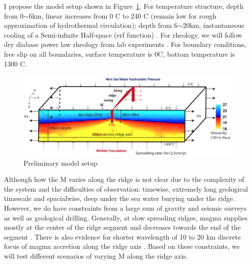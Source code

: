 \documentclass[12pt]{article}
\begin{document}
I propose the model setup shown in Figure~\ref{fig8_1}. For temperature structure, depth from 0$\sim$6km, linear increases from 0 \degree C to 240 \degree C (remain low for rough approximation of hydrothermal circulation); depth from 6$\sim$20km, instantaneous cooling of a Semi-infinite Half-space (erf function) \citep{Turcotte2002}. For rheology, we will follow dry diabase power law rheology from lab experiments \citep{Kirby1987}. For boundary conditions, free slip on all boundaries, surface temperature is 0\degree C, bottom temperature is 1300 \degree C.

\begin{figure}[H]
 \centering
  \includegraphics[scale=0.5]{fig8_1.png}
 \caption{\small Preliminary model setup}
 \label{fig8_1}
\end{figure}


Although how the M varies along the ridge is not clear due to the complexity of the system and the difficulties of observation: timewise, extremely long geological timescale and spacialwise, deep under the sea water burying under the ridge. However, we do have constraints from a large sum of gravity and seismic surveys as well as geological drilling. Generally, at slow spreading ridges, magma supplies mostly at the center of the ridge segment and decreases towards the end of the segment \citep{Tolstoy1993,Chen1999}. There is also evidence for shorter wavelength of 10 to 20 km discrete focus of magma accretion along the ridge axis \citep{Lin1990}. Based on these constraints, we will test different scenarios of varying M along the ridge axis.

 
\end{document}
